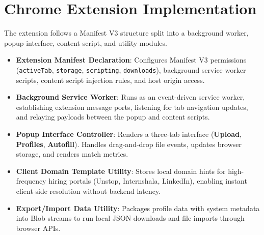 \documentclass[12pt,a4paper]{report}
\begin{document}
\section{Chrome Extension Implementation}
The extension follows a Manifest V3 structure split into a background worker, popup interface, content script, and utility modules.
\begin{itemize}
    \item \textbf{Extension Manifest Declaration}: Configures Manifest V3 permissions (\texttt{activeTab}, \texttt{storage}, \texttt{scripting}, \texttt{downloads}), background service worker scripts, content script injection rules, and host origin access.
    \item \textbf{Background Service Worker}: Runs as an event-driven service worker, establishing extension message ports, listening for tab navigation updates, and relaying payloads between the popup and content scripts.
    \item \textbf{Popup Interface Controller}: Renders a three-tab interface (\textbf{Upload}, \textbf{Profiles}, \textbf{Autofill}). Handles drag-and-drop file events, updates browser storage, and renders match metrics.
    \item \textbf{Client Domain Template Utility}: Stores local domain hints for high-frequency hiring portals (Unstop, Internshala, LinkedIn), enabling instant client-side resolution without backend latency.
    \item \textbf{Export/Import Data Utility}: Packages profile data with system metadata into Blob streams to run local JSON downloads and file imports through browser APIs.
\end{itemize}
\end{document}
